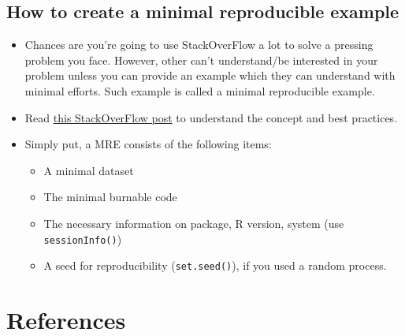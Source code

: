 \documentclass[
]{book}
\providecommand{\tightlist}{%
  \setlength{\itemsep}{0pt}\setlength{\parskip}{0pt}}
\begin{document}
\hypertarget{how-to-create-a-minimal-reproducible-example}{%
\subsection{How to create a minimal reproducible example}\label{how-to-create-a-minimal-reproducible-example}}

\begin{itemize}
\item
  Chances are you're going to use StackOverFlow a lot to solve a pressing problem you face. However, other can't understand/be interested in your problem unless you can provide an example which they can understand with minimal efforts. Such example is called a minimal reproducible example.
\item
  Read \href{https://stackoverflow.com/questions/5963269/how-to-make-a-great-r-reproducible-example}{this StackOverFlow post} to understand the concept and best practices.
\item
  Simply put, a MRE consists of the following items:

  \begin{itemize}
  \tightlist
  \item
    A minimal dataset
  \item
    The minimal burnable code
  \item
    The necessary information on package, R version, system (use \texttt{sessionInfo()})
  \item
    A seed for reproducibility (\texttt{set.seed()}), if you used a random process.
  \end{itemize}
\end{itemize}

\hypertarget{references}{%
\section{References}\label{references}}
\end{document}
